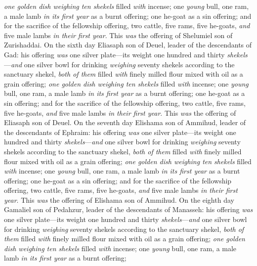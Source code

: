 \begin{biblechapter}
\verse \textit{one golden dish weighing ten shekels} filled \textit{with} incense;
\verse one \textit{young} bull, one ram, a male lamb \textit{in its first year} as a burnt offering;
\verse one he-goat as a sin offering;
\verse and for the sacrifice of the fellowship offering, two cattle, five rams, five he-goats, \textit{and} five male lambs \textit{in their first year}. This \textit{was} the offering of Shelumiel son of Zurishaddai.
\verse On the sixth day Eliasaph son of Deuel, leader of the descendants of Gad:
\verse his offering \textit{was} one silver plate—its weight one hundred and thirty \textit{shekels}—\textit{and} one silver bowl for drinking \textit{weighing} seventy shekels according to the sanctuary shekel, \textit{both of them} filled \textit{with} finely milled flour mixed with oil as a grain offering;
\verse \textit{one golden dish weighing ten shekels} filled \textit{with} incense;
\verse one \textit{young} bull, one ram, a male lamb \textit{in its first year} as a burnt offering;
\verse one he-goat as a sin offering;
\verse and for the sacrifice of the fellowship offering, two cattle, five rams, five he-goats, \textit{and} five male lambs \textit{in their first year}. This \textit{was} the offering of Eliasaph son of Deuel.
\verse On the seventh day Elishama son of Ammihud, leader of the descendants of Ephraim:
\verse his offering \textit{was} one silver plate—its weight one hundred and thirty \textit{shekels}—\textit{and} one silver bowl for drinking \textit{weighing} seventy shekels according to the sanctuary shekel, \textit{both of them} filled \textit{with} finely milled flour mixed with oil as a grain offering;
\verse \textit{one golden dish weighing ten shekels} filled \textit{with} incense;
\verse one \textit{young} bull, one ram, a male lamb \textit{in its first year} as a burnt offering;
\verse one he-goat as a sin offering;
\verse and for the sacrifice of the fellowship offering, two cattle, five rams, five he-goats, \textit{and} five male lambs \textit{in their first year}. This \textit{was} the offering of Elishama son of Ammihud.
\verse On the eighth day Gamaliel son of Pedahzur, leader of the descendants of Manasseh:
\verse his offering \textit{was} one silver plate—its weight one hundred and thirty \textit{shekels}—\textit{and} one silver bowl for drinking \textit{weighing} seventy shekels according to the sanctuary shekel, \textit{both of them} filled \textit{with} finely milled flour mixed with oil as a grain offering;
\verse \textit{one golden dish weighing ten shekels} filled \textit{with} incense;
\verse one \textit{young} bull, one ram, a male lamb \textit{in its first year} as a burnt offering;

\end{biblechapter}
